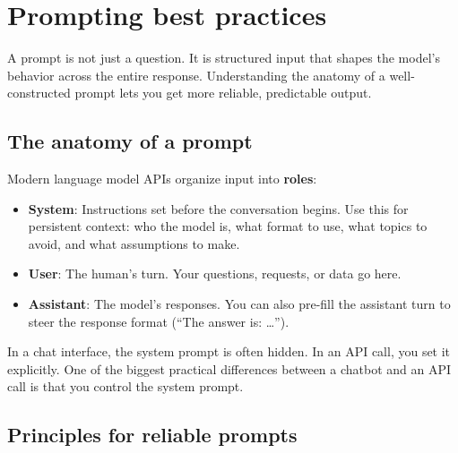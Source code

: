 \section{Prompting best practices}

A prompt is not just a question. It is structured input that shapes the model's behavior across the entire response. Understanding the anatomy of a well-constructed prompt lets you get more reliable, predictable output.

\subsection{The anatomy of a prompt}

Modern language model APIs organize input into \textbf{roles}:

\begin{itemize}[noitemsep,topsep=0pt]
  \item \textbf{System}: Instructions set before the conversation begins. Use this for persistent context: who the model is, what format to use, what topics to avoid, and what assumptions to make.
  \item \textbf{User}: The human's turn. Your questions, requests, or data go here.
  \item \textbf{Assistant}: The model's responses. You can also pre-fill the assistant turn to steer the response format (``The answer is: \ldots'').
\end{itemize}

In a chat interface, the system prompt is often hidden. In an API call, you set it explicitly. One of the biggest practical differences between a chatbot and an API call is that you control the system prompt.

\subsection{Principles for reliable prompts}

